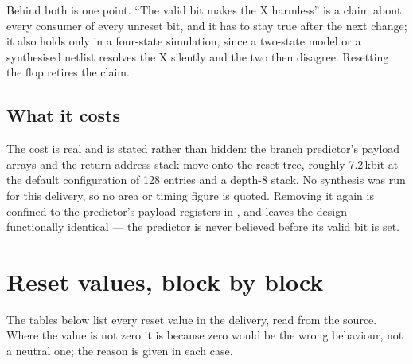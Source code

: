 Behind both is one point. ``The valid bit makes the X harmless'' is a claim about
every consumer of every unreset bit, and it has to stay true after the next
change; it also holds only in a four-state simulation, since a two-state model or
a synthesised netlist resolves the X silently and the two then disagree.
Resetting the flop retires the claim.

\subsection*{What it costs}
\label{sec:resetcost}

The cost is real and is stated rather than hidden:
the branch predictor's payload arrays and the return-address stack move onto the
reset tree, roughly 7.2\,kbit at the default configuration of 128 entries and a
depth-8 stack. No synthesis was run for this delivery, so no area or timing
figure is quoted. Removing it again is confined to the predictor's
payload registers in , and leaves the design
functionally identical --- the predictor is never believed before its valid bit
is set.

\section{Reset values, block by block}

The tables below list every reset value in the delivery, read from the source.
Where the value is not zero it is because zero would be the wrong behaviour, not
a neutral one; the reason is given in each case.

